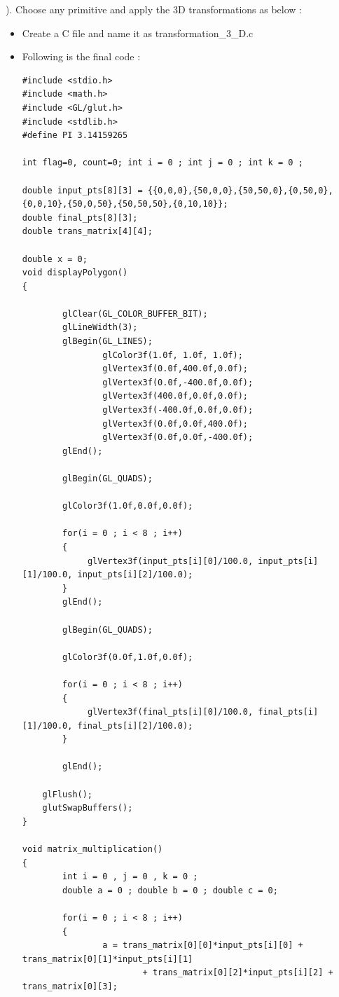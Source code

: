 \vspace{0.5mm} ). Choose any primitive and apply the 3D transformations as below  :
\begin{itemize}
\item Create a C file and name it as transformation\_3\_D.c
\item Following is the final code :
\begin{lstlisting}
#include <stdio.h>
#include <math.h>
#include <GL/glut.h>
#include <stdlib.h>
#define PI 3.14159265

int flag=0, count=0; int i = 0 ; int j = 0 ; int k = 0 ;

double input_pts[8][3] = {{0,0,0},{50,0,0},{50,50,0},{0,50,0},{0,0,10},{50,0,50},{50,50,50},{0,10,10}};
double final_pts[8][3];
double trans_matrix[4][4];

double x = 0;
void displayPolygon()
{

        glClear(GL_COLOR_BUFFER_BIT);
        glLineWidth(3);
        glBegin(GL_LINES);
                glColor3f(1.0f, 1.0f, 1.0f);
                glVertex3f(0.0f,400.0f,0.0f);
                glVertex3f(0.0f,-400.0f,0.0f);
                glVertex3f(400.0f,0.0f,0.0f);
                glVertex3f(-400.0f,0.0f,0.0f);
                glVertex3f(0.0f,0.0f,400.0f);
                glVertex3f(0.0f,0.0f,-400.0f);
        glEnd();

        glBegin(GL_QUADS);

        glColor3f(1.0f,0.0f,0.0f);

        for(i = 0 ; i < 8 ; i++)
        {
        	 glVertex3f(input_pts[i][0]/100.0, input_pts[i][1]/100.0, input_pts[i][2]/100.0);
        }
        glEnd();

        glBegin(GL_QUADS);

        glColor3f(0.0f,1.0f,0.0f);

        for(i = 0 ; i < 8 ; i++)
        {
        	 glVertex3f(final_pts[i][0]/100.0, final_pts[i][1]/100.0, final_pts[i][2]/100.0);
        }

        glEnd();

	glFlush();
	glutSwapBuffers();
}

void matrix_multiplication()
{
        int i = 0 , j = 0 , k = 0 ;
        double a = 0 ; double b = 0 ; double c = 0;

        for(i = 0 ; i < 8 ; i++)
        {
                a = trans_matrix[0][0]*input_pts[i][0] + trans_matrix[0][1]*input_pts[i][1]
                		+ trans_matrix[0][2]*input_pts[i][2] + trans_matrix[0][3];


\end{lstlisting}
\end{itemize}

